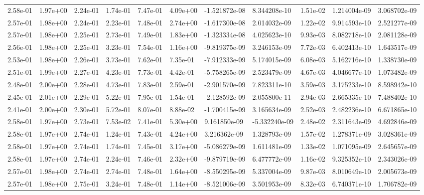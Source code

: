 \begin{longtable}{| p{} | p{} |}
2.58e-01 & 1.97e+00 & 2.24e-01 & 1.74e-01 & 7.47e-01 & 4.09e+00 & -1.521872e-08 &  8.344208e-10 &  1.51e-02 &  1.214004e-09 &  3.068702e-09 \\
2.57e-01 & 1.98e+00 & 2.24e-01 & 2.23e-01 & 7.48e-01 & 2.74e+00 & -1.617300e-08 &  2.014032e-09 &  1.22e-02 &  9.914593e-10 &  2.521277e-09 \\
2.57e-01 & 1.98e+00 & 2.25e-01 & 2.73e-01 & 7.49e-01 & 1.83e+00 & -1.323334e-08 &  4.025623e-10 &  9.93e-03 &  8.082718e-10 &  2.081128e-09 \\
2.56e-01 & 1.98e+00 & 2.25e-01 & 3.23e-01 & 7.54e-01 & 1.16e+00 & -9.819375e-09 &  3.246153e-09 &  7.72e-03 &  6.402413e-10 &  1.643517e-09 \\
2.53e-01 & 1.98e+00 & 2.26e-01 & 3.73e-01 & 7.62e-01 & 7.35e-01 & -7.912333e-09 &  5.174015e-09 &  6.08e-03 &  5.162716e-10 &  1.338730e-09 \\
2.51e-01 & 1.99e+00 & 2.27e-01 & 4.23e-01 & 7.73e-01 & 4.42e-01 & -5.758265e-09 &  2.523479e-09 &  4.67e-03 &  4.046677e-10 &  1.073482e-09 \\
2.48e-01 & 2.00e+00 & 2.28e-01 & 4.73e-01 & 7.83e-01 & 2.59e-01 & -2.901570e-09 &  7.823311e-10 &  3.59e-03 &  3.175233e-10 &  8.598942e-10 \\
2.45e-01 & 2.01e+00 & 2.29e-01 & 5.22e-01 & 7.95e-01 & 1.54e-01 & -2.128592e-09 &  2.055800e-11 &  2.94e-03 &  2.665335e-10 &  7.488402e-10 \\
2.41e-01 & 2.00e+00 & 2.30e-01 & 5.72e-01 & 8.07e-01 & 8.88e-02 & -1.700415e-09 &  3.165634e-09 &  2.52e-03 &  2.482236e-10 &  6.671865e-10 \\
2.58e-01 & 1.97e+00 & 2.73e-01 & 7.53e-02 & 7.41e-01 & 5.30e+00 &  9.161850e-09 & -5.332240e-09 &  2.48e-02 &  2.311643e-09 &  4.692846e-09 \\
2.58e-01 & 1.97e+00 & 2.74e-01 & 1.24e-01 & 7.43e-01 & 4.24e+00 &  3.216362e-09 &  1.328793e-09 &  1.57e-02 &  1.278371e-09 &  3.028361e-09 \\
2.58e-01 & 1.97e+00 & 2.74e-01 & 1.74e-01 & 7.45e-01 & 3.17e+00 & -5.086279e-09 &  1.611481e-09 &  1.33e-02 &  1.071095e-09 &  2.645657e-09 \\
2.58e-01 & 1.97e+00 & 2.74e-01 & 2.24e-01 & 7.46e-01 & 2.32e+00 & -9.879719e-09 &  6.477772e-09 &  1.16e-02 &  9.325352e-10 &  2.343026e-09 \\
2.57e-01 & 1.98e+00 & 2.74e-01 & 2.74e-01 & 7.48e-01 & 1.64e+00 & -8.550295e-09 &  5.337004e-09 &  9.87e-03 &  8.010649e-10 &  2.005673e-09 \\
2.57e-01 & 1.98e+00 & 2.75e-01 & 3.24e-01 & 7.48e-01 & 1.14e+00 & -8.521006e-09 &  3.501953e-09 &  8.32e-03 &  6.740371e-10 &  1.706782e-09 \\

\end{longtable}
